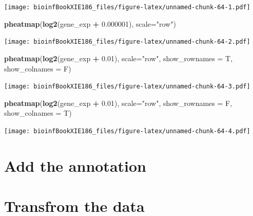 \documentclass[]{book}
\makeatletter
\newenvironment{Shaded}{\begin{snugshade}}{\end{snugshade}}
\newcommand{\KeywordTok}[1]{\textcolor[rgb]{0.13,0.29,0.53}{\textbf{#1}}}
\newcommand{\DataTypeTok}[1]{\textcolor[rgb]{0.13,0.29,0.53}{#1}}
\newcommand{\FloatTok}[1]{\textcolor[rgb]{0.00,0.00,0.81}{#1}}
\newcommand{\StringTok}[1]{\textcolor[rgb]{0.31,0.60,0.02}{#1}}
\newcommand{\OperatorTok}[1]{\textcolor[rgb]{0.81,0.36,0.00}{\textbf{#1}}}
\newcommand{\NormalTok}[1]{#1}
\newenvironment{kframe}{%
\medskip{}
\setlength{\fboxsep}{.8em}
 \def\at@end@of@kframe{}%
 \ifinner\ifhmode%
  \def\at@end@of@kframe{\end{minipage}}%
  \begin{minipage}{\columnwidth}%
 \fi\fi%
 \def\FrameCommand##1{\hskip\@totalleftmargin \hskip-\fboxsep
 \colorbox{shadecolor}{##1}\hskip-\fboxsep
     \hskip-\linewidth \hskip-\@totalleftmargin \hskip\columnwidth}%
 \MakeFramed {\advance\hsize-\width
   \@totalleftmargin\z@ \linewidth\hsize
   \@setminipage}}%
 {\par\unskip\endMakeFramed%
 \at@end@of@kframe}
\renewenvironment{Shaded}{\begin{kframe}}{\end{kframe}}
\theoremstyle{definition}
\theoremstyle{definition}
\theoremstyle{definition}
\theoremstyle{remark}
\makeatother
\begin{document}
\texttt{[image: bioinfBookXIE186\_files/figure-latex/unnamed-chunk-64-1.pdf]}

\begin{Shaded}
\begin{Highlighting}[]
\KeywordTok{pheatmap}\NormalTok{(}\KeywordTok{log2}\NormalTok{(gene_exp }\OperatorTok{+}\StringTok{ }\FloatTok{0.000001}\NormalTok{), }\DataTypeTok{scale=}\StringTok{"row"}\NormalTok{)}
\end{Highlighting}
\end{Shaded}

\texttt{[image: bioinfBookXIE186\_files/figure-latex/unnamed-chunk-64-2.pdf]}

\begin{Shaded}
\begin{Highlighting}[]
\KeywordTok{pheatmap}\NormalTok{(}\KeywordTok{log2}\NormalTok{(gene_exp }\OperatorTok{+}\StringTok{ }\FloatTok{0.01}\NormalTok{), }\DataTypeTok{scale=}\StringTok{"row"}\NormalTok{, }\DataTypeTok{show_rownames =}\NormalTok{ T, }\DataTypeTok{show_colnames =}\NormalTok{ F)}
\end{Highlighting}
\end{Shaded}

\texttt{[image: bioinfBookXIE186\_files/figure-latex/unnamed-chunk-64-3.pdf]}

\begin{Shaded}
\begin{Highlighting}[]
\KeywordTok{pheatmap}\NormalTok{(}\KeywordTok{log2}\NormalTok{(gene_exp }\OperatorTok{+}\StringTok{ }\FloatTok{0.01}\NormalTok{), }\DataTypeTok{scale=}\StringTok{"row"}\NormalTok{, }\DataTypeTok{show_rownames =}\NormalTok{ F, }\DataTypeTok{show_colnames =}\NormalTok{ T)}
\end{Highlighting}
\end{Shaded}

\texttt{[image: bioinfBookXIE186\_files/figure-latex/unnamed-chunk-64-4.pdf]}

\section{Add the annotation}\label{add-the-annotation}

\section{}\label{section-6}

\section{Transfrom the data}\label{transfrom-the-data}
\end{document}
